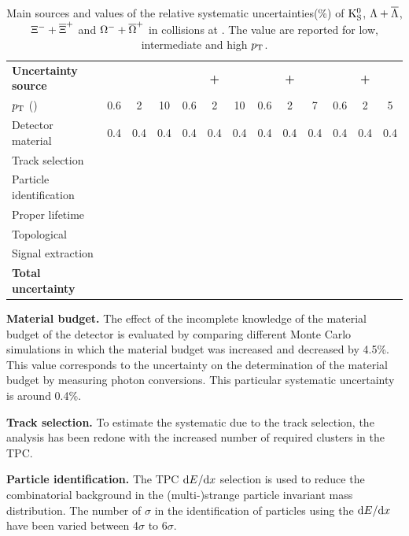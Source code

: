 \begin{table}[!ht]
	\begin{center}
		\caption{Main sources and values of the relative systematic uncertainties(\%) of ${\rm K}^{0}_{\rm{S}}$,  $\Lambda + \overline{\Lambda}$, $\Xi^- + \overline{\Xi}^+$ and $\Omega^- + \overline{\Omega}^+$ in \pPb collisions at \fivenn. The value are reported for low, intermediate and high $p_{\rm T}$.}
		\label{Tab:pPbInclUncer}
		\begin{tabularx}{\textwidth}{@{} lCCCCCCCCCCCC @{}}
			\toprule
			\textbf{Uncertainty source} &  & &  & \\
			\cmidrule(lr){2-4}  \cmidrule(lr){5-7} \cmidrule(lr){8-10} \cmidrule(lr){11-13} 
			$p_{\rm T}$ (\GeVc) & 0.6 & 2 &10   & 0.6 & 2 & 10     & 0.6 & 2 & 7    & 0.6& 2 & 5 \\
			\midrule 
			Detector material& 0.4 & 0.4 & 0.4 &  0.4 & 0.4 & 0.4 &  0.4 & 0.4 & 0.4 &  0.4 & 0.4 & 0.4  \\
			Track selection\\
			Particle identification\\
			Proper lifetime\\
			Topological\\
			Signal extraction\\
			\midrule
			\textbf{Total uncertainty}\\
			\bottomrule
		\end{tabularx}
	\end{center}
\end{table}

\textbf{Material budget.} The effect of the incomplete knowledge of the material budget of the detector is evaluated by comparing different Monte Carlo simulations in which the material budget was increased and decreased by 4.5\%. This value corresponds to the uncertainty on the determination of the material budget by measuring photon conversions. This particular systematic uncertainty is around 0.4\%. 

\textbf{Track selection.} To estimate the systematic due to the track selection, the analysis has been redone with the increased number of required clusters in the TPC. 

\textbf{Particle identification.} The TPC $\textrm{d}E/\textrm{d}x$ selection is used to reduce the combinatorial background in the (multi-)strange particle invariant mass distribution. The number of $\sigma$ in the identification of particles using the $\textrm{d}E/\textrm{d}x$ have been varied between 4$\sigma$ to 6$\sigma$.

